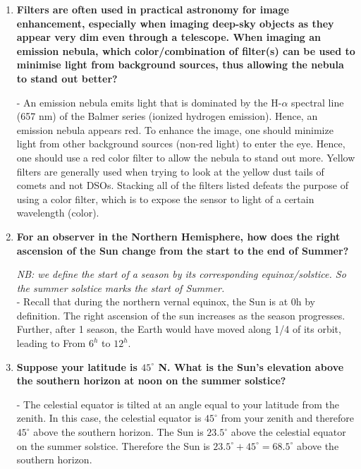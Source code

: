 \documentclass[a4paper,12pt]{extarticle}
\begin{document}
\begin{enumerate}
\item \textbf{Filters are often used in practical astronomy for image enhancement, especially when imaging deep-sky objects as they appear very dim even through a telescope. When imaging an emission nebula, which color/combination of filter(s) can be used to minimise light from background sources, thus allowing the nebula to stand out better?}

\begin{sol}
- An emission nebula emits light that is dominated by the H-$\alpha$ spectral line (657 nm) of the Balmer series (ionized hydrogen emission). Hence, an emission nebula appears red. To enhance the image, one should minimize light from other background sources (non-red light) to enter the eye. Hence, one should use a red color filter to allow the nebula to stand out more. Yellow filters are generally used when trying to look at the yellow dust tails of comets and not DSOs. Stacking all of the filters listed defeats the purpose of using a color filter, which is to expose the sensor to light of a certain wavelength (color).	
\end{sol}

\item \textbf{For an observer in the Northern Hemisphere, how does the right ascension of the Sun change from the start to the end of Summer?}
\begin{sol}
\textit{NB: we define the start of a season by its corresponding equinox/solstice. So the summer solstice marks the start of Summer.}\\

- Recall that during the northern vernal equinox, the Sun is at 0h by definition. The right ascension of the sun increases as the season progresses. Further, after 1 season, the Earth would have moved along 1/4 of its orbit, leading to From $6^h$ to $12^h$.	
\end{sol}

\item \textbf{Suppose your latitude is $45^\circ$ N. What is the Sun's elevation above the southern horizon at noon on the summer solstice?}
\begin{sol}
- The celestial equator is tilted at an angle equal to your latitude from the zenith. In this case, the celestial equator is $45^\circ$ from your zenith and therefore $45^\circ$ above the southern horizon. The Sun is $23.5^\circ$ above the celestial equator on the summer solstice. Therefore the Sun is $23.5^\circ+ 45^\circ= 68.5^\circ$ above the southern horizon.
\end{sol}


\end{enumerate}
\end{document}

